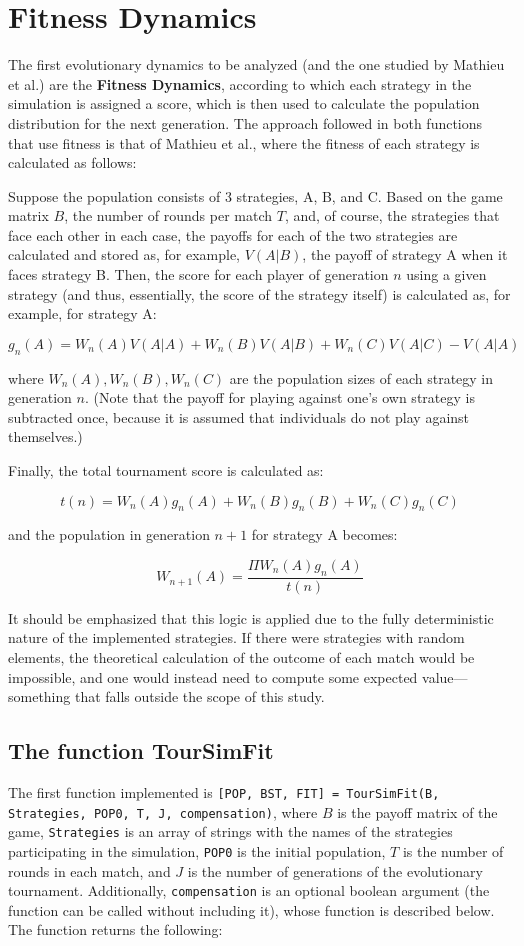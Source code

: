 \section{Fitness Dynamics}

The first evolutionary dynamics to be analyzed (and the one studied by Mathieu et al.) are the \textbf{Fitness Dynamics}, according to which each strategy in the simulation is assigned a score, which is then used to calculate the population distribution for the next generation. The approach followed in both functions that use fitness is that of Mathieu et al., where the fitness of each strategy is calculated as follows:

Suppose the population consists of 3 strategies, A, B, and C. Based on the game matrix $B$, the number of rounds per match $T$, and, of course, the strategies that face each other in each case, the payoffs for each of the two strategies are calculated and stored as, for example, $V(A|B)$, the payoff of strategy A when it faces strategy B. Then, the score for each player of generation $n$ using a given strategy (and thus, essentially, the score of the strategy itself) is calculated as, for example, for strategy A:

\[
g_n(A) = W_n(A)V(A|A) + W_n(B)V(A|B) + W_n(C)V(A|C) - V(A|A)
\]

where $W_n(A), W_n(B), W_n(C)$ are the population sizes of each strategy in generation $n$. (Note that the payoff for playing against one’s own strategy is subtracted once, because it is assumed that individuals do not play against themselves.)

Finally, the total tournament score is calculated as:

\[
t(n) = W_n(A)g_n(A) + W_n(B)g_n(B) + W_n(C)g_n(C)
\]

and the population in generation $n+1$ for strategy A becomes:

\[
W_{n+1}(A) = \frac{\Pi W_n(A)g_n(A)}{t(n)}
\]

It should be emphasized that this logic is applied due to the fully deterministic nature of the implemented strategies. If there were strategies with random elements, the theoretical calculation of the outcome of each match would be impossible, and one would instead need to compute some expected value---something that falls outside the scope of this study.
\subsection{The function TourSimFit}
The first function implemented is \texttt{[POP, BST, FIT] = TourSimFit(B, Strategies, POP0, T, J, compensation)}, where $B$ is the payoff matrix of the game, \texttt{Strategies} is an array of strings with the names of the strategies participating in the simulation, \texttt{POP0} is the initial population, $T$ is the number of rounds in each match, and $J$ is the number of generations of the evolutionary tournament. Additionally, \texttt{compensation} is an optional boolean argument (the function can be called without including it), whose function is described below. The function returns the following:

